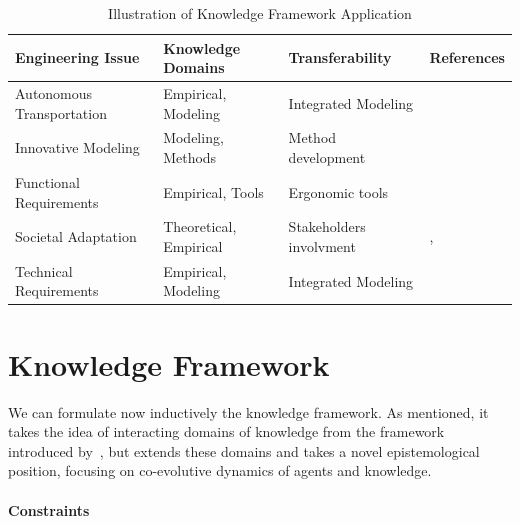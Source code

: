 \documentclass[runningheads,a4paper]{llncs2e/llncs}
\begin{document}
\begin{table}[h!]
\hspace{-1cm}
\caption{Illustration of Knowledge Framework Application}
\label{tab:application}
\begin{tabular}[10pt]{|l|l|l|l|}
\hline
\textbf{Engineering Issue} & \textbf{Knowledge Domains} & \textbf{Transferability} & \textbf{References}\\\hline
Autonomous Transportation & Empirical, Modeling & Integrated Modeling & \cite{belmonte2008automatisation}\\\hline
Innovative Modeling & Modeling, Methods & Method development & \cite{balbo2016positionnement}\\\hline
Functional Requirements & Empirical, Tools & Ergonomic tools & \cite{foot2005faut}\\\hline
Societal Adaptation & Theoretical, Empirical & Stakeholders involvment & \cite{foot1994ratp}, \cite{hatchuel1988stations}\\\hline
Technical Requirements & Empirical, Modeling & Integrated Modeling & \cite{moreno2016etude}\\\hline
\end{tabular}
\end{table}




\section{Knowledge Framework}


We can formulate now inductively the knowledge framework. As mentioned, it takes the idea of interacting domains of knowledge from the framework introduced by~\cite{livet2010}, but extends these domains and takes a novel epistemological position, focusing on co-evolutive dynamics of agents and knowledge.


\paragraph{Constraints}
\end{document}

